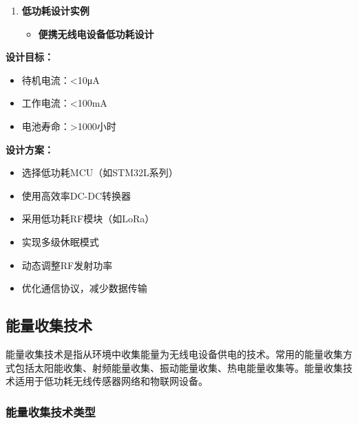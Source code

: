 \documentclass[12pt,UTF8]{ctexbook}
\begin{document}
\begin{enumerate}
    \item \textbf{低功耗设计实例}
    \begin{itemize}
        \item \textbf{便携无线电设备低功耗设计}
    \end{itemize}
\end{enumerate}

\textbf{设计目标：}
\begin{itemize}
    \item 待机电流：<10μA
    \item 工作电流：<100mA
\end{itemize}
\begin{itemize}
    \item 电池寿命：>1000小时
\end{itemize}

\textbf{设计方案：}
\begin{itemize}
    \item 选择低功耗MCU（如STM32L系列）
\end{itemize}
\begin{itemize}
    \item 使用高效率DC-DC转换器
    \item 采用低功耗RF模块（如LoRa）
    \item 实现多级休眠模式
    \item 动态调整RF发射功率
\end{itemize}
\begin{itemize}
    \item 优化通信协议，减少数据传输
\end{itemize}

\subsection{能量收集技术}

能量收集技术是指从环境中收集能量为无线电设备供电的技术。常用的能量收集方式包括太阳能收集、射频能量收集、振动能量收集、热电能量收集等。能量收集技术适用于低功耗无线传感器网络和物联网设备。

\subsubsection{能量收集技术类型}
\end{document}
